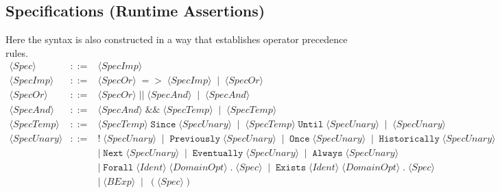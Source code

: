 \documentclass{article}
\begin{document}
\subsection{Specifications (Runtime Assertions)}
Here the syntax is also constructed in a way that establishes operator precedence rules.
\[
\begin{array}{rcl}
\langle \mathit{Spec} \rangle
&::=&
\langle \mathit{SpecImp} \rangle \\[4pt]

\langle \mathit{SpecImp} \rangle
&::=&
\langle \mathit{SpecOr} \rangle\;\mathtt{=>}\;\langle \mathit{SpecImp} \rangle
\;\mid\;
\langle \mathit{SpecOr} \rangle \\[4pt]

\langle \mathit{SpecOr} \rangle
&::=&
\langle \mathit{SpecOr} \rangle\;\mathtt{||}\;\langle \mathit{SpecAnd} \rangle
\;\mid\;
\langle \mathit{SpecAnd} \rangle \\[4pt]

\langle \mathit{SpecAnd} \rangle
&::=&
\langle \mathit{SpecAnd} \rangle\;\mathtt{\&\&}\;\langle \mathit{SpecTemp} \rangle
\;\mid\;
\langle \mathit{SpecTemp} \rangle \\[4pt]

\langle \mathit{SpecTemp} \rangle
&::=&
\langle \mathit{SpecTemp} \rangle\;\mathtt{Since}\;\langle \mathit{SpecUnary} \rangle
\;\mid\;
\langle \mathit{SpecTemp} \rangle\;\mathtt{Until}\;\langle \mathit{SpecUnary} \rangle
\;\mid\;
\langle \mathit{SpecUnary} \rangle \\[4pt]

\langle \mathit{SpecUnary} \rangle
&::=&
\mathtt{!}\;\langle \mathit{SpecUnary} \rangle
\;\mid\;
\mathtt{Previously}\;\langle \mathit{SpecUnary} \rangle
\;\mid\;
\mathtt{Once}\;\langle \mathit{SpecUnary} \rangle
\;\mid\;
\mathtt{Historically}\;\langle \mathit{SpecUnary} \rangle \\[2pt]
&&
\mid\;
\mathtt{Next}\;\langle \mathit{SpecUnary} \rangle
\;\mid\;
\mathtt{Eventually}\;\langle \mathit{SpecUnary} \rangle
\;\mid\;
\mathtt{Always}\;\langle \mathit{SpecUnary} \rangle \\[2pt]
&&
\mid\;
\mathtt{Forall}\;\langle \mathit{Ident} \rangle\;\langle \mathit{DomainOpt} \rangle\;\texttt{.}\;\langle \mathit{Spec} \rangle
\;\mid\;
\mathtt{Exists}\;\langle \mathit{Ident} \rangle\;\langle \mathit{DomainOpt} \rangle\;\texttt{.}\;\langle \mathit{Spec} \rangle \\[2pt]
&&
\mid\;
\langle \mathit{BExp} \rangle
\;\mid\;
(\langle \mathit{Spec} \rangle) \\[4pt]


\end{array}\]
\end{document}
